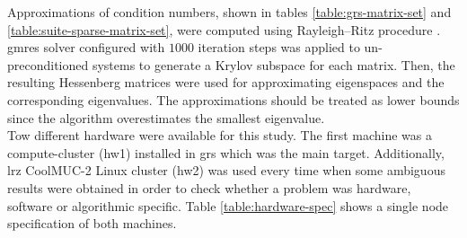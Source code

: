 Approximations of condition numbers, shown in tables \ref{table:grs-matrix-set} and \ref{table:suite-sparse-matrix-set},  were computed using Rayleigh–Ritz procedure \cite{rayleigh-ritz-procedure}. \acrshort{gmres} solver configured with $1000$ iteration steps was applied to un-preconditioned systems to generate a Krylov subspace for each matrix. Then, the resulting Hessenberg matrices were used for approximating eigenspaces and the corresponding eigenvalues. The approximations should be treated as lower bounds since the algorithm overestimates the smallest eigenvalue.\\




Tow different hardware were available for this study. The first machine was a compute-cluster (\gls{hw1}) installed in \acrshort{grs} which was the main target. Additionally, \acrshort{lrz} CoolMUC-2 Linux cluster (\gls{hw2}) was used every time when some ambiguous results were obtained in order to check whether a problem was hardware, software or algorithmic specific. Table \ref{table:hardware-spec} shows a single node specification of both machines.\\


